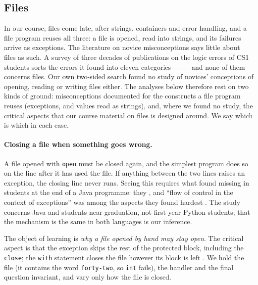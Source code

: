 \mode*
\subsection{Files}
\label{files}

In our course, files come late, after strings, containers and error
handling, and a file program reuses all three: a file is opened, read into strings, and its
failures arrive as exceptions.
The literature on novice misconceptions says little about files as such.
A survey of three decades of publications on the logic errors of CS1
students sorts the errors it found into eleven categories ---
 --- and none of them
concerns files.
Our own two-sided search found no study of novices' conceptions of opening,
reading or writing files either.
The analyses below therefore rest on two kinds of ground: misconceptions
documented for the constructs a file program reuses (exceptions, and
values read as strings), and, where we found no study, the critical
aspects that our course material on files is designed around.
We say which is which in each case.

\paragraph{Closing a file when something goes wrong.}
A file opened with \texttt{open} must be closed again, and
the simplest program does so on the line after it has used the file.
If anything between the two lines raises an exception, the closing line
never runs.
Seeing this requires what \textcite{RashkovitsLavy2012} found missing in
students at the end of a Java programme: they
, and
\enquote{flow of control in the context of exceptions} was among the
aspects they found hardest \autocite[350]{RashkovitsLavy2012}.
The study concerns Java and students near graduation, not first-year
Python students; that the mechanism is the same in both languages is our
inference.

The object of learning is \emph{why a file opened by hand may stay open}.
The critical aspect is that the exception skips the rest of the protected
block, including the \texttt{close}; the
\texttt{with} statement closes the file however its block is
left \autocite{PythonTutorialFiles}.
We hold the file (it contains the word \texttt{forty-two}, so
\texttt{int} fails), the handler and the final question
invariant, and vary only how the file is closed.

